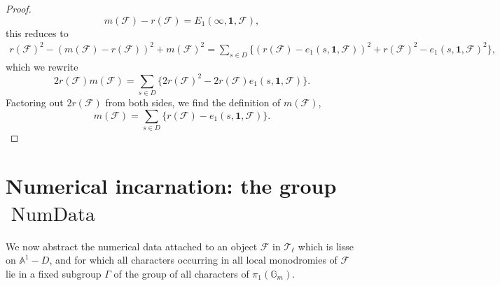 \begin{proof}
\[
m(\mathcal{F})-r(\mathcal{F})=E_1(\infty,\mathbf{1},\mathcal{F}),
\]
this reduces to
\[
\begin{aligned}
r(\mathcal{F})^2-(m(\mathcal{F})-r(\mathcal{F}))^2+m(\mathcal{F})^2
=\sum_{s\in D}\{(r(\mathcal{F})-e_1(s,\mathbf{1},\mathcal{F}))^2+r(\mathcal{F})^2-e_1(s,\mathbf{1},\mathcal{F})^2\},
\end{aligned}
\]
which we rewrite
\[
2r(\mathcal{F})m(\mathcal{F})=\sum_{s\in D}\{2r(\mathcal{F})^2-2r(\mathcal{F})e_1(s,\mathbf{1},\mathcal{F})\}.
\]
Factoring out \(2r(\mathcal{F})\) from both sides, we find the definition of \(m(\mathcal{F})\),
\[
m(\mathcal{F})=\sum_{s\in D}\{r(\mathcal{F})-e_1(s,\mathbf{1},\mathcal{F})\}.
\]
\end{proof}

\section{Numerical incarnation: the group
\texorpdfstring{\(\operatorname{NumData}\)}{NumData}}
\label{sec:6.1}

We now abstract the numerical data attached to an object \(\mathcal{F}\) in \(\mathcal{T}_\ell\) which is lisse on \(\mathbb{A}^1-D\), and for which all characters occurring in all local monodromies of \(\mathcal{F}\) lie in a fixed subgroup \(\Gamma\) of the group of all characters of \(\pi_1(\mathbb{G}_m)\).

